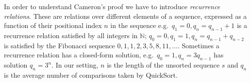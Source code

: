 \documentclass[a4paper]{book}
\theoremstyle{changebreak}                %
\begin{document}
In order to understand Cameron's proof we have to introduce {\it
  recurrence relations}. These are
relations over different elements of a
sequence, expressed as a function of their
positional index $n$ in the sequence
e.g.~$q_1=0,q_n=q_{n-1}+1$ is a recurrence relation satisfied by all
integers in $\mathbb{N}$; $q_0=0, q_1=1,
q_n=q_{n-1}+q_{n-2}$ is satisfied by the Fibonacci sequence
$0,1,1,2,3,5,8,11,\ldots$. Sometimes a recurrence relation has a
closed-form solution, e.g.~$q_0=1,
q_n=3q_{n-1}$ has solution $q_n=3^n$. In our setting, $n$ is the
length of the unsorted sequence $s$ and $q_n$
is the average number of comparisons taken by {\sc
  QuickSort}.
\end{document}
